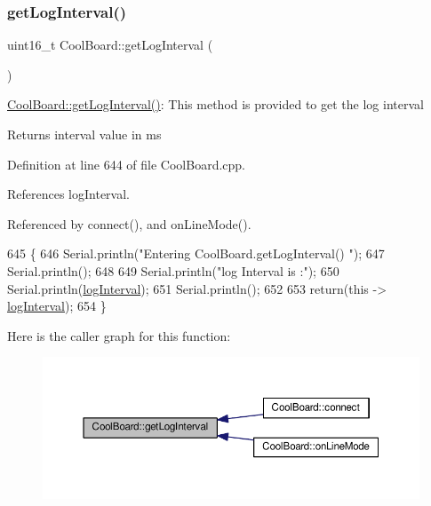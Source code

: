 \subsubsection{\texorpdfstring{get\+Log\+Interval()}{getLogInterval()}}
{\footnotesize\ttfamily uint16\+\_\+t Cool\+Board\+::get\+Log\+Interval (\begin{DoxyParamCaption}{ }\end{DoxyParamCaption})}

\hyperlink{classCoolBoard_aaa24480b273fc095a1356a589c333781}{Cool\+Board\+::get\+Log\+Interval()}\+: This method is provided to get the log interval

\begin{DoxyReturn}{Returns}
interval value in ms 
\end{DoxyReturn}


Definition at line 644 of file Cool\+Board.\+cpp.



References log\+Interval.



Referenced by connect(), and on\+Line\+Mode().


\begin{DoxyCode}
645 \{
646     Serial.println(\textcolor{stringliteral}{"Entering CoolBoard.getLogInterval() "});
647     Serial.println();
648 
649     Serial.println(\textcolor{stringliteral}{"log Interval is :"});
650     Serial.println(\hyperlink{classCoolBoard_a4de0096d575d66b472c4c1f0111fd452}{logInterval});
651     Serial.println();
652 
653     \textcolor{keywordflow}{return}(\textcolor{keyword}{this} -> \hyperlink{classCoolBoard_a4de0096d575d66b472c4c1f0111fd452}{logInterval});
654 \}
\end{DoxyCode}
Here is the caller graph for this function\+:
\nopagebreak
\begin{figure}[H]
\begin{center}
\leavevmode
\includegraphics[width=350pt]{classCoolBoard_aaa24480b273fc095a1356a589c333781_icgraph}
\end{center}
\end{figure}
\mbox{\label{classCoolBoard_ae6b5e1274d760462290192acea4adca8}} 
